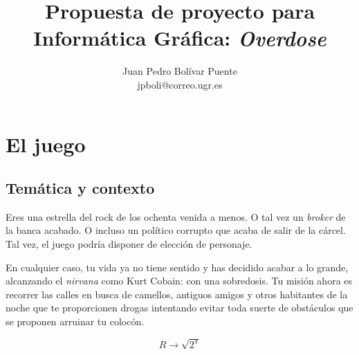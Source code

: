 \documentclass[a4paper,10pt,spanish]{article}
\title{Propuesta de proyecto para Informática Gráfica: \emph{Overdose}}
\author{Juan Pedro Bolívar Puente\\jpboli@correo.ugr.es}
\date{}
\begin{document}
\maketitle

\section{El juego}

\subsection{Temática y contexto}

Eres una estrella del rock de los ochenta venida a menos. O tal vez un \emph{broker} de la banca acabado. O incluso un político corrupto que acaba de salir de la cárcel. Tal vez, el juego podría disponer de elección de personaje. 

En cualquier caso, tu vida ya no tiene sentido y has decidido acabar a lo grande, alcanzando el \emph{nirvana} como Kurt Cobain: con una sobredosis. Tu misión ahora es recorrer las calles en busca de camellos, antiguos amigos y otros habitantes de la noche que te proporcionen drogas intentando evitar toda suerte de obstáculos que se proponen arruinar tu colocón.

$$  R \rightarrow \sqrt{2^\pi} $$
\end{document}
